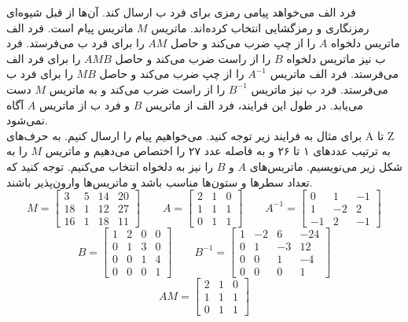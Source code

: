 \begin{example}[رمزنگاری]
	فرد الف می‌خواهد پیامی رمزی برای فرد ب ارسال کند. آن‌ها از قبل شیوه‌ای رمزنگاری و رمزگشایی انتخاب کرده‌اند. ماتریس $M$ ماتریس پیام است. فرد الف ماتریس دلخواه $A$ را از چپ ضرب می‌کند و حاصل $AM$ را برای فرد ب می‌فرستد. فرد ب نیز ماتریس دلخواه $B$ را از راست ضرب می‌کند و حاصل $AMB$ را برای فرد الف می‌فرستد. فرد الف ماتریس
	$A^{-1}$
	را از چپ ضرب می‌کند و حاصل $MB$ را برای فرد ب می‌فرستد. فرد ب نیز ماتریس
	$B^{-1}$
	را از راست ضرب می‌کند و به ماتریس $M$ دست می‌یابد. در طول این فرایند، فرد الف از ماتریس $B$ و فرد ب از ماتریس $A$ آگاه نمی‌شود. \\
	برای مثال به فرایند زیر توجه کنید. می‌خواهیم پیام
	را ارسال کنیم. به حرف‌های A تا Z به ترتیب عددهای ۱ تا ۲۶ و به فاصله عدد ۲۷ را اختصاص می‌دهیم و ماتریس $M$ را به شکل زیر می‌نویسیم. ماتریس‌های $A$ و $B$ را نیز به دلخواه انتخاب می‌کنیم. توجه کنید که تعداد سطرها و ستون‌ها مناسب باشد و ماتریس‌ها وارون‌پذیر باشند.
	\[
	M=
	\begin{bmatrix}
		3 & 5 & 14 & 20 \\
		18 & 1 & 12 & 27 \\
		16 & 1 & 18 & 11
	\end{bmatrix}
	\qquad
	A=
	\begin{bmatrix}
		2 & 1 & 0 \\
		1 & 1 & 1 \\
		0 & 1 & 1
	\end{bmatrix}
	\qquad
	A^{-1}=
	\begin{bmatrix}
		0 & 1 & -1 \\
		1 & -2 & 2 \\
		-1 & 2 & -1
	\end{bmatrix}
	\]
	\[
	B=
	\begin{bmatrix}
		1 & 2 & 0 & 0 \\
		0 & 1 & 3 & 0 \\
		0 & 0 & 1 & 4 \\
		0 & 0 & 0 & 1
	\end{bmatrix}
	\qquad
	B^{-1}=
	\begin{bmatrix}
		1 & -2 & 6 & -24 \\
		0 & 1 & -3 & 12 \\
		0 & 0 & 1 & -4 \\
		0 & 0 & 0 & 1
	\end{bmatrix}
	\]
	\[
	AM=
	\begin{bmatrix}
		2 & 1 & 0 \\
		1 & 1 & 1 \\
		0 & 1 & 1
	\end{bmatrix}
\]
\end{example}
